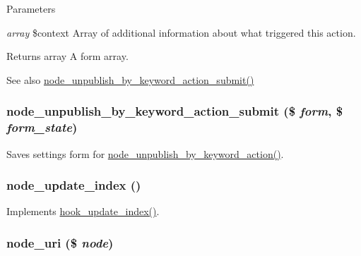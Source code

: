 \begin{DoxyParams}{Parameters}
\item[{\em array}]\$context Array of additional information about what triggered this action.\end{DoxyParams}
\begin{DoxyReturn}{Returns}
array A form array.
\end{DoxyReturn}
\begin{DoxySeeAlso}{See also}
\hyperlink{node_8module_a26e6379bcb14b8b4f694567e17c3cd6e}{node\_\-unpublish\_\-by\_\-keyword\_\-action\_\-submit()} 
\end{DoxySeeAlso}
\hypertarget{node_8module_a26e6379bcb14b8b4f694567e17c3cd6e}{
\subsubsection[{node\_\-unpublish\_\-by\_\-keyword\_\-action\_\-submit}]{\setlength{\rightskip}{0pt plus 5cm}node\_\-unpublish\_\-by\_\-keyword\_\-action\_\-submit (\$ {\em form}, \/  \$ {\em form\_\-state})}}
\label{node_8module_a26e6379bcb14b8b4f694567e17c3cd6e}
Saves settings form for \hyperlink{group__actions_gaa453e8f47436b80070213abd851535d0}{node\_\-unpublish\_\-by\_\-keyword\_\-action()}. \hypertarget{node_8module_a4310054ba3c28aad3c32f497898fb744}{
\subsubsection[{node\_\-update\_\-index}]{\setlength{\rightskip}{0pt plus 5cm}node\_\-update\_\-index ()}}
\label{node_8module_a4310054ba3c28aad3c32f497898fb744}
Implements \hyperlink{group__search_ga23d6f6642bd53c4f033f10e9c1b12d43}{hook\_\-update\_\-index()}. \hypertarget{node_8module_aa809f2afb7e8cba7f972b1fa7bc4fc38}{
\subsubsection[{node\_\-uri}]{\setlength{\rightskip}{0pt plus 5cm}node\_\-uri (\$ {\em node})}}
